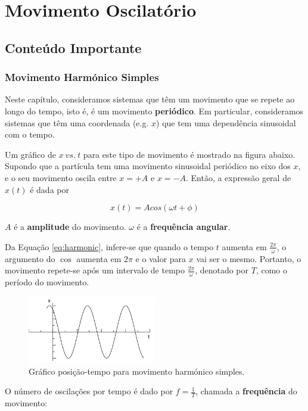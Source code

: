 \section{Movimento Oscilatório}
\subsection{Conteúdo Importante}
\subsubsection{Movimento Harmónico Simples}

Neste capítulo, consideramos sistemas que têm um movimento que se repete ao longo do tempo, isto é, é um movimento \textbf{periódico}. Em particular, consideramos sistemas que têm uma coordenada (e.g. $x$) que tem uma dependência sinusoidal com o tempo.

Um gráfico de $x\ vs.\ t$ para este tipo de movimento é mostrado na figura abaixo. Supondo que a partícula tem uma movimento sinusoidal periódico no eixo dos $x$, e o seu movimento oscila entre $x=+A$ e $x=-A$. Então, a expressão geral de $x(t)$ é dada por

\begin{equation}\label{eq:harmonic}
    x(t)=Acos(\omega t+\phi)
\end{equation}

$A$ é a \textbf{amplitude} do movimento. $\omega$ é a \textbf{frequência angular}. 

Da Equação \ref{eq:harmonic}, infere-se que quando o tempo $t$ aumenta em  $\frac{2\pi}{\omega}$, o argumento do $\cos$ aumenta em $2\pi$ e o valor para $x$ vai ser o mesmo. Portanto, o movimento repete-se após um intervalo de tempo $\frac{2\pi}{\omega}$, denotado por $T$, como o período do movimento.

\begin{figure}[h!]
    \centering
    \includegraphics[width=0.5\textwidth]{10/fig/harmonic.png}
    \caption{Gráfico posição-tempo para movimento harmónico simples.}
\end{figure}

O número de oscilações por tempo é dado por $f=\frac{1}{T}$, chamada a \textbf{frequência} do movimento:

